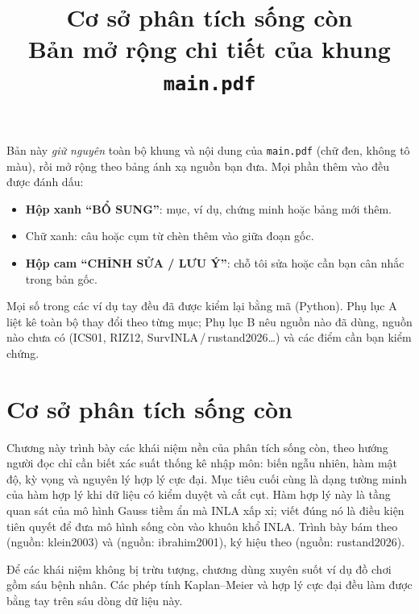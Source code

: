 \documentclass[11pt,a4paper,notitlepage]{report}
\title{\bfseries Cơ sở phân tích sống còn\\[4pt]\large Bản mở rộng chi tiết của khung \texttt{main.pdf}}
\author{}
\date{}
\providecommand{\nguon}[1]{(nguồn: #1)}
\newcommand{\bs}[1]{\textcolor{bsblue}{#1}}
\begin{document}
\maketitle

\begin{bosung}
Bản này \emph{giữ nguyên} toàn bộ khung và nội dung của \texttt{main.pdf} (chữ đen, không tô màu), rồi mở rộng theo bảng
ánh xạ nguồn bạn đưa. Mọi phần thêm vào đều được đánh dấu:
\begin{itemize}[leftmargin=1.4em,itemsep=1pt,topsep=2pt]
  \item \textbf{Hộp xanh ``BỔ SUNG''}: mục, ví dụ, chứng minh hoặc bảng mới thêm.
  \item \bs{Chữ xanh}: câu hoặc cụm từ chèn thêm vào giữa đoạn gốc.
  \item \textbf{Hộp cam ``CHỈNH SỬA / LƯU Ý''}: chỗ tôi sửa hoặc cần bạn cân nhắc trong bản gốc.
\end{itemize}
Mọi số trong các ví dụ tay đều đã được kiểm lại bằng mã (Python). Phụ lục A liệt kê toàn bộ thay đổi theo từng mục;
Phụ lục B nêu nguồn nào đã dùng, nguồn nào chưa có (ICS01, RIZ12, SurvINLA\,/\,rustand2026\ldots) và các điểm cần bạn kiểm chứng.
\end{bosung}

\tableofcontents

\chapter{Cơ sở phân tích sống còn}

Chương này trình bày các khái niệm nền của phân tích sống còn, theo hướng người đọc chỉ cần
biết xác suất thống kê nhập môn: biến ngẫu nhiên, hàm mật độ, kỳ vọng và nguyên lý hợp lý cực
đại. Mục tiêu cuối cùng là dạng tường minh của hàm hợp lý khi dữ liệu có kiểm duyệt và cắt cụt.
Hàm hợp lý này là tầng quan sát của mô hình Gauss tiềm ẩn mà INLA xấp xỉ; viết đúng nó là
điều kiện tiên quyết để đưa mô hình sống còn vào khuôn khổ INLA. Trình bày bám theo \nguon{klein2003} và \nguon{ibrahim2001}, ký hiệu theo \nguon{rustand2026}.

Để các khái niệm không bị trừu tượng, chương dùng xuyên suốt ví dụ đồ chơi gồm sáu bệnh nhân.
Các phép tính Kaplan--Meier và hợp lý cực đại đều làm được bằng tay trên sáu dòng dữ liệu này.
\end{document}
